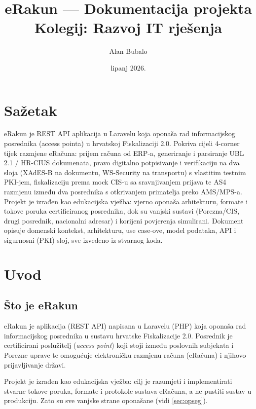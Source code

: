 \documentclass[11pt,a4paper]{article}
\title{\textbf{eRakun — Dokumentacija projekta}\\[0.4em]
  {\large Kolegij: Razvoj IT rješenja}}
\author{Alan Bubalo}
\date{lipanj 2026.}
\begin{document}
\maketitle

\section*{Sažetak}

eRakun je REST API aplikacija u Laravelu koja oponaša rad informacijskog
posrednika (access pointa) u hrvatskoj Fiskalizaciji 2.0. Pokriva cijeli
4-corner tijek razmjene eRačuna: prijem računa od ERP-a, generiranje i parsiranje
UBL 2.1 / HR-CIUS dokumenata, pravo digitalno potpisivanje i verifikaciju
na dva sloja (XAdES-B na dokumentu, WS-Security na transportu) s vlastitim testnim PKI-jem,
fiskalizaciju prema mock CIS-u sa sravnjivanjem prijava te AS4 razmjenu
između dva posrednika s otkrivanjem primatelja preko AMS/MPS-a. Projekt je izrađen kao
edukacijska vježba: vjerno oponaša arhitekturu, formate i tokove poruka
certificiranog posrednika, dok su vanjski sustavi (Porezna/CIS, drugi posrednik, nacionalni
adresar) i korijeni povjerenja simulirani. Dokument opisuje domenski kontekst,
arhitekturu, use case-ove, model podataka, API i sigurnosni (PKI) sloj, sve izvedeno iz
stvarnog koda.

\tableofcontents
\bigskip

\section{Uvod}

\subsection{Što je eRakun}

eRakun je aplikacija (REST API) napisana u Laravelu (PHP) koja oponaša rad
informacijskog posrednika u sustavu hrvatske Fiskalizacije 2.0. Posrednik je
certificirani poslužitelj (\textit{access point}) koji stoji između poslovnih subjekata i
Porezne uprave te omogućuje elektroničku razmjenu računa (eRačuna) i njihovo
prijavljivanje državi.

Projekt je izrađen kao edukacijska vježba: cilj je razumjeti i implementirati
stvarne tokove poruka, formate i protokole sustava eRačuna, a ne pustiti sustav u
produkciju. Zato su sve vanjske strane oponašane (vidi \ref{sec:opseg}).
\end{document}
